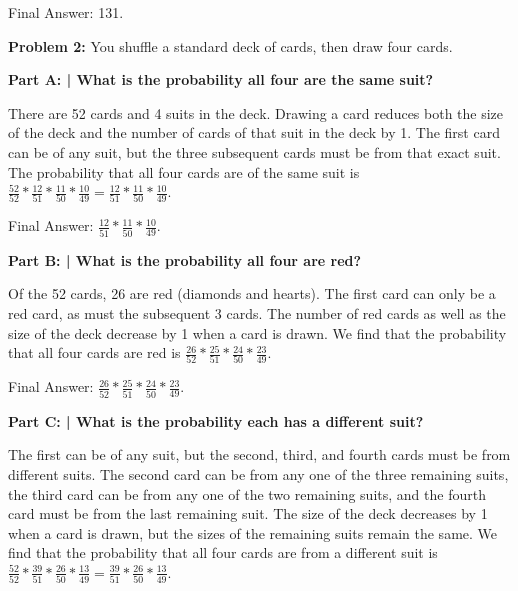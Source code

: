 \documentclass{article}
\begin{document}
 Final Answer: 131. \newline

 \newpage
 
 \noindent\makebox[\linewidth]{\rule{\paperwidth}{0.4pt}}\newline
 
 \begin{center}
      \Large\textbf{Problem 2:} You shuffle a standard deck of cards, then draw four cards.\par
 \end{center}
 
 \textbf{Part A: | What is the probability all four are the same suit?}\newline
 
 There are 52 cards and 4 suits in the deck. Drawing a card reduces both the size of the deck and the number of cards of that suit in the deck by 1. The first card can be of any suit, but the three subsequent cards must be from that exact suit. The probability that all four cards are of the same suit is $\frac{52}{52} * \frac{12}{51} * \frac{11}{50} * \frac{10}{49} = \frac{12}{51} * \frac{11}{50} * \frac{10}{49}$.\newline
 
 
 Final Answer: $\frac{12}{51} * \frac{11}{50} * \frac{10}{49}$.\newline
 
 \textbf{Part B: | What is the probability all four are red?}\newline
 
 Of the 52 cards, 26 are red (diamonds and hearts). The first card can only be a red card, as must the subsequent 3 cards. The number of red cards as well as the size of the deck decrease by 1 when a card is drawn. We find that the probability that all four cards are red is $\frac{26}{52} * \frac{25}{51} * \frac{24}{50} * \frac{23}{49}$.\newline
 
 Final Answer: $\frac{26}{52} * \frac{25}{51} * \frac{24}{50} * \frac{23}{49}$.\newline
 
 \textbf{Part C: | What is the probability each has a different suit?}\newline
 
 The first can be of any suit, but the second, third, and fourth cards must be from different suits. The second card can be from any one of the three remaining suits, the third card can be from any one of the two remaining suits, and the fourth card must be from the last remaining suit. The size of the deck decreases by 1 when a card is drawn, but the sizes of the remaining suits remain the same. We find that the probability that all four cards are from a different suit is $\frac{52}{52} * \frac{39}{51} * \frac{26}{50} * \frac{13}{49} = \frac{39}{51} * \frac{26}{50} * \frac{13}{49}$.\newline
 
\end{document}
